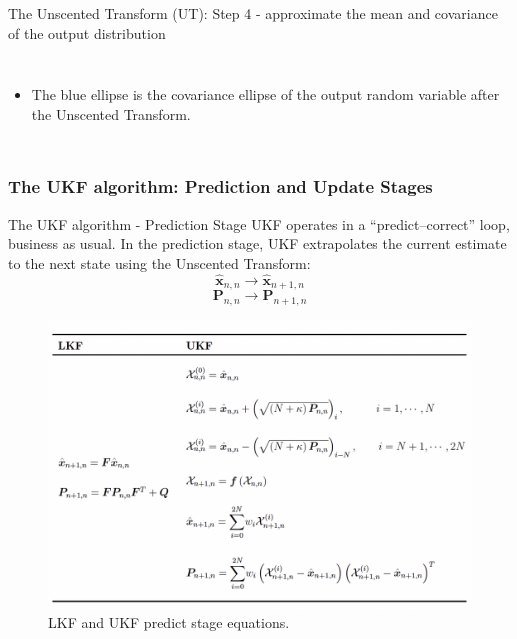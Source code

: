 \begin{frame}{The Unscented Transform (UT): Step 4 - approximate the mean and covariance of the output distribution}
\begin{columns}
\begin{itemize}
    \item The blue ellipse is the covariance ellipse of the output random variable after the Unscented Transform.
\end{itemize}
\end{columns}
\end{frame}


\subsubsection{The UKF algorithm: Prediction and Update Stages}
\begin{frame}{The UKF algorithm - Prediction Stage}
UKF operates in a “predict–correct” loop, business as usual. In the prediction stage, UKF extrapolates the current estimate to the next state using the Unscented Transform:
\[
\hat{\mathbf{x}}_{n,n} \rightarrow \hat{\mathbf{x}}_{n+1,n}
\]
\[
\mathbf{P}_{n,n} \rightarrow \mathbf{P}_{n+1,n}
\]
\vspace{-14pt}
\begin{figure}
    \centering
    \includegraphics[width=0.75\linewidth]{Figures//Part3/UKF_PredictionStage.png}
    \vspace{-12pt}
    \caption{LKF and UKF predict stage equations.}
\end{figure}
\end{frame}


